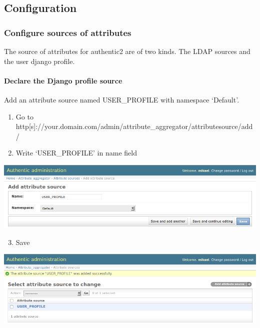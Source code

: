 \documentclass[letterpaper,10pt,english]{sphinxmanual}
\begin{document}
\subsection{Configuration}
\label{attribute_management:configuration}

\subsubsection{Configure sources of attributes}
\label{attribute_management:configure-sources-of-attributes}
The source of attributes for authentic2 are of two kinds. The LDAP sources and
the user django profile.


\paragraph{Declare the Django profile source}
\label{attribute_management:declare-the-django-profile-source}
Add an attribute source named USER\_PROFILE with namespace `Default'.
\begin{enumerate}
\item {} 
Go to http{[}s{]}://your.domain.com/admin/attribute\_aggregator/attributesource/add/

\item {} 
Write `USER\_PROFILE' in name field

\end{enumerate}

\includegraphics{user_profile_source.png}
\begin{enumerate}
\setcounter{enumi}{2}
\item {} 
Save

\end{enumerate}

\includegraphics{user_profile_source_saved.png}
\end{document}
